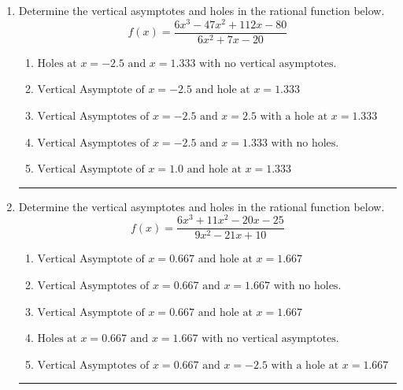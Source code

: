 \documentclass[14pt]{extbook}
\newcommand{\litem}[1]{\item#1\hspace*{-1cm}\rule{\textwidth}{0.4pt}}
\begin{document}
\begin{enumerate}
\litem{
Determine the vertical asymptotes and holes in the rational function below.\[ f(x) = \frac{6x^{3} -47 x^{2} +112 x -80}{6x^{2} +7 x -20} \]\begin{enumerate}[label=\Alph*.]
\item \( \text{Holes at } x = -2.5 \text{ and } x = 1.333 \text{ with no vertical asymptotes.} \)
\item \( \text{Vertical Asymptote of } x = -2.5 \text{ and hole at } x = 1.333 \)
\item \( \text{Vertical Asymptotes of } x = -2.5 \text{ and } x = 2.5 \text{ with a hole at } x = 1.333 \)
\item \( \text{Vertical Asymptotes of } x = -2.5 \text{ and } x = 1.333 \text{ with no holes.} \)
\item \( \text{Vertical Asymptote of } x = 1.0 \text{ and hole at } x = 1.333 \)

\end{enumerate} }
\litem{
Determine the vertical asymptotes and holes in the rational function below.\[ f(x) = \frac{6x^{3} +11 x^{2} -20 x -25}{9x^{2} -21 x + 10} \]\begin{enumerate}[label=\Alph*.]
\item \( \text{Vertical Asymptote of } x = 0.667 \text{ and hole at } x = 1.667 \)
\item \( \text{Vertical Asymptotes of } x = 0.667 \text{ and } x = 1.667 \text{ with no holes.} \)
\item \( \text{Vertical Asymptote of } x = 0.667 \text{ and hole at } x = 1.667 \)
\item \( \text{Holes at } x = 0.667 \text{ and } x = 1.667 \text{ with no vertical asymptotes.} \)
\item \( \text{Vertical Asymptotes of } x = 0.667 \text{ and } x = -2.5 \text{ with a hole at } x = 1.667 \)


\end{enumerate}}
\end{enumerate}
\end{document}
